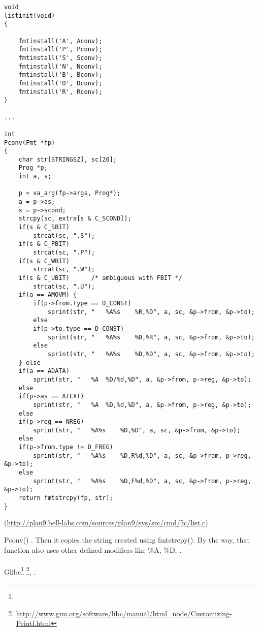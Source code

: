 \begin{lstlisting}[caption=go\textbackslash{}src\textbackslash{}cmd\textbackslash{}5c\textbackslash{}list.c]
void
listinit(void)
{

	fmtinstall('A', Aconv);
	fmtinstall('P', Pconv);
	fmtinstall('S', Sconv);
	fmtinstall('N', Nconv);
	fmtinstall('B', Bconv);
	fmtinstall('D', Dconv);
	fmtinstall('R', Rconv);
}

...

int
Pconv(Fmt *fp)
{
	char str[STRINGSZ], sc[20];
	Prog *p;
	int a, s;

	p = va_arg(fp->args, Prog*);
	a = p->as;
	s = p->scond;
	strcpy(sc, extra[s & C_SCOND]);
	if(s & C_SBIT)
		strcat(sc, ".S");
	if(s & C_PBIT)
		strcat(sc, ".P");
	if(s & C_WBIT)
		strcat(sc, ".W");
	if(s & C_UBIT)		/* ambiguous with FBIT */
		strcat(sc, ".U");
	if(a == AMOVM) {
		if(p->from.type == D_CONST)
			sprint(str, "	%A%s	%R,%D", a, sc, &p->from, &p->to);
		else
		if(p->to.type == D_CONST)
			sprint(str, "	%A%s	%D,%R", a, sc, &p->from, &p->to);
		else
			sprint(str, "	%A%s	%D,%D", a, sc, &p->from, &p->to);
	} else
	if(a == ADATA)
		sprint(str, "	%A	%D/%d,%D", a, &p->from, p->reg, &p->to);
	else
	if(p->as == ATEXT)
		sprint(str, "	%A	%D,%d,%D", a, &p->from, p->reg, &p->to);
	else
	if(p->reg == NREG)
		sprint(str, "	%A%s	%D,%D", a, sc, &p->from, &p->to);
	else
	if(p->from.type != D_FREG)
		sprint(str, "	%A%s	%D,R%d,%D", a, sc, &p->from, p->reg, &p->to);
	else
		sprint(str, "	%A%s	%D,F%d,%D", a, sc, &p->from, p->reg, &p->to);
	return fmtstrcpy(fp, str);
}
\end{lstlisting}
(\url{http://plan9.bell-labs.com/sources/plan9/sys/src/cmd/5c/list.c})

 Pconv() 
.
{Then it copies the string created using} fmtstrcpy().
{By the way, that function also uses other defined modifiers like} \%A, \%D, . \\
\\
 Glibc\footnote{} 
\footnote{\url{http://www.gnu.org/software/libc/manual/html_node/Customizing-Printf.html}}, 
 .

